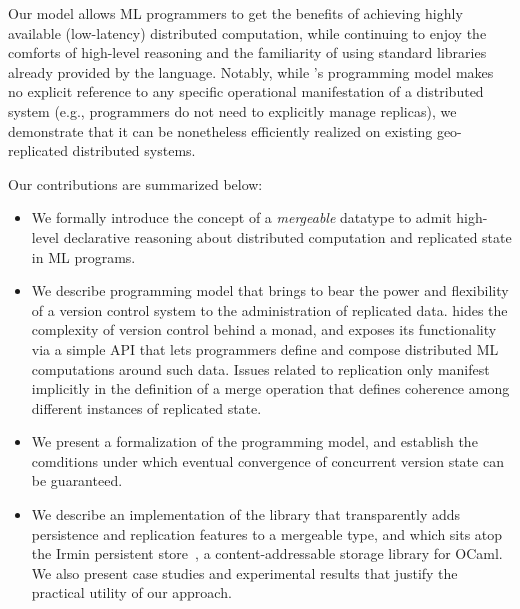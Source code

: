 Our model allows ML programmers to get the benefits of achieving
highly available (low-latency) distributed computation, while
continuing to enjoy the comforts of high-level reasoning and the
familiarity of using standard libraries already provided by the
language.  Notably, while \name's programming model makes no explicit
reference to any specific operational manifestation of a distributed
system (e.g., programmers do not need to explicitly manage replicas),
we demonstrate that it can be nonetheless efficiently realized on
existing geo-replicated distributed systems.

Our contributions are summarized below:

\begin{itemize}
    \item We formally introduce the concept of a \emph{mergeable}
      datatype to admit high-level declarative reasoning about
      distributed computation and replicated state in ML programs.

    \item We describe \name programming model that brings to bear the
      power and flexibility of a version control system to the
      administration of replicated data. \name hides the complexity of
      version control behind a monad, and exposes its functionality
      via a simple API that lets programmers define and compose
      distributed ML computations around such data.  Issues related to
      replication only manifest implicitly in the definition of a
      merge operation that defines coherence among different instances
      of replicated state.

    \item We present a formalization of the \name programming model,
      and establish the comditions under which eventual convergence of
      concurrent version state can be guaranteed.

    \item We describe an implementation of the \name library that
      transparently adds persistence and replication features to a
      mergeable type, and which sits atop the Irmin persistent
      store~\cite{irmin}, a content-addressable storage library for
      OCaml.  We also present case studies and experimental results
      that justify the practical utility of our approach.
\end{itemize}



